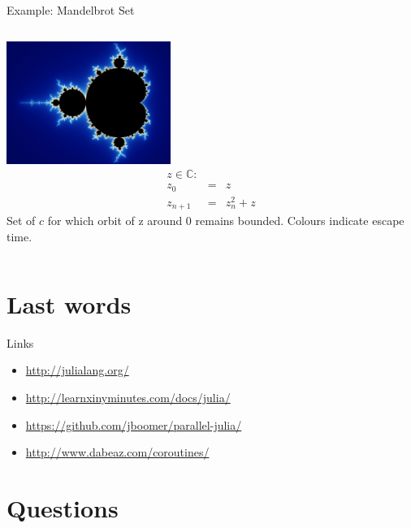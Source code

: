 \documentclass{beamer}
\begin{document}
	\begin{frame}{Example: Mandelbrot Set}
		\begin{columns}[c]
			\includegraphics[height = 4cm]{figures/mandel_zoom.jpg}	
			\begin{equation*}
			\begin{array}{rcl}
				z\in\mathbb{C}: & & \\
				z_0 & = & z	\\
				z_{n+1} & = & z_n^2 + z
			\end{array}
			\end{equation*}
			Set of $c$ for which orbit of z around 0 remains bounded. Colours indicate escape time.
		\end{columns}
	\end{frame}
	
	\section{Last words}
	
	\begin{frame}{Links}
		\begin{itemize}
			\item{\url{http://julialang.org/}}
			\item{\url{http://learnxinyminutes.com/docs/julia/}}
			\item{\url{https://github.com/jboomer/parallel-julia/}}
			\item{\url{http://www.dabeaz.com/coroutines/}}
		\end{itemize}
	\end{frame}
	
	\section{Questions}
\end{document}
